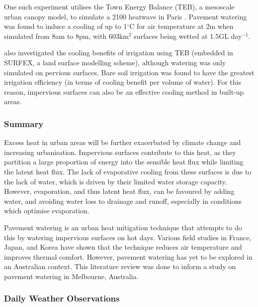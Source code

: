 \documentclass[final,3p,times,authoryear]{elsarticle}
\begin{document}
One such experiment utilises the Town Energy Balance (TEB), a mesoscale urban canopy model, to simulate a 2100 heatwave in Paris \citep{Daniel2018}. Pavement watering was found to induce a cooling of up to 1$^{\circ}$C for air temperature at 2m when simulated from 8am to 8pm, with 603km$^{2}$ surfaces being wetted at 1.5GL day$^{-1}$. 

\cite{Broadbent2018b} also investigated the cooling benefits of irrigation using TEB (embedded in SURFEX, a land surface modelling scheme), although watering was only simulated on pervious surfaces. Bare soil irrigation was found to have the greatest irrigation efficiency (in terms of cooling benefit per volume of water). For this reason, impervious surfaces can also be an effective cooling method in built-up areas.

\subsubsection{Summary}\label{sec:appendix7.1.5}
Excess heat in urban areas will be further exacerbated by climate change and increasing urbanisation. Impervious surfaces contribute to this heat, as they partition a large proportion of energy into the sensible heat flux while limiting the latent heat flux. The lack of evaporative cooling from these surfaces is due to the lack of water, which is driven by their limited water storage capacity. However, evaporation, and thus latent heat flux, can be favoured by adding water, and avoiding water loss to drainage and runoff, especially in conditions which optimise evaporation.

Pavement watering is an urban heat mitigation technique that attempts to do this by watering impervious surfaces on hot days. Various field studies in France, Japan, and Korea have shown that the technique reduces air temperature and improves thermal comfort. However, pavement watering has yet to be explored in an Australian context. This literature review was done to inform a study on pavement watering in Melbourne, Australia.

\subsubsection{Daily Weather Observations}\label{sec:appendix7.2}
\end{document}
